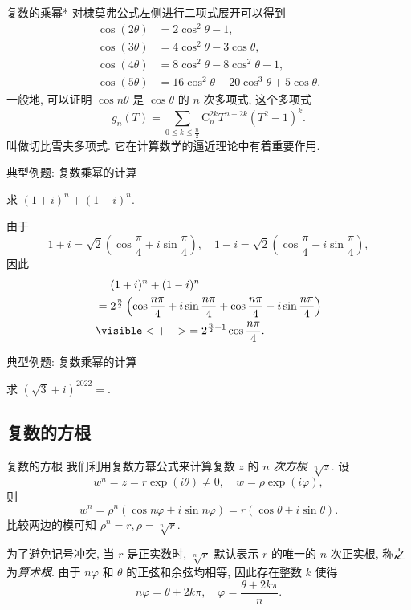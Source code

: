 \begin{frame}{复数的乘幂*}
\onslide<+->
对棣莫弗公式左侧进行二项式展开可以得到
\onslide<+->
\begin{align*}
	\cos(2\theta)&=2\cos^2\theta-1,\\
	\cos(3\theta)&=4\cos^2\theta-3\cos\theta,\\
	\cos(4\theta)&=8\cos^2\theta-8\cos^2\theta+1,\\
	\cos(5\theta)&=16\cos^2\theta-20\cos^3\theta+5\cos\theta.
\end{align*}
\onslide<+->
一般地, 可以证明 $\cos{n\theta}$ 是 $\cos\theta$ 的 $n$ 次多项式,
\onslide<+->
这个多项式
\[g_n(T)=\sum_{0\le k\le\frac n2}\mathrm{C}_n^{2k} T^{n-2k} (T^2-1)^k.\]
叫做切比雪夫多项式.
\onslide<+->
它在计算数学的逼近理论中有着重要作用.
\end{frame}


\begin{frame}{典型例题: 复数乘幂的计算}
\onslide<+->
\begin{example}
求 $(1+i)^n+(1-i)^n$.
\end{example}
\onslide<+->
\begin{solution}
由于
\[1+i=\sqrt2\left(\cos\frac\pi4+i\sin\frac\pi4\right),\quad
1-i=\sqrt2\left(\cos\frac\pi4-i\sin\frac\pi4\right),\]
\onslide<+->
因此
\vspace{-\baselineskip}
\begin{align*}
&\peq(1+i)^n+(1-i)^n\\
&=2^{\frac n2}\left(\cos\frac{n\pi}4+i\sin\frac{n\pi}4+\cos\frac{n\pi}4-i\sin\frac{n\pi}4\right)\\
&\visible<+->{=2^{\frac n2+1}\cos\frac{n\pi}4.}
\end{align*}
\vspace{-\baselineskip}
\end{solution}
\end{frame}


\begin{frame}{典型例题: 复数乘幂的计算}
\onslide<+->
\begin{exercise}
求 $(\sqrt3+i)^{2022}=$.
\end{exercise}
\end{frame}


\subsection{复数的方根}
\begin{frame}{复数的方根}
\onslide<+->
我们利用复数方幂公式来计算复数 $z$ 的 \emph{$n$ 次方根 $\sqrt[n]z$}.
\onslide<+->
设
\[w^n=z=r\exp(i\theta)\neq0,\quad w=\rho\exp(i\varphi),\]
\onslide<+->
则
\[w^n=\rho^n(\cos{n\varphi}+i\sin{n\varphi})=r(\cos\theta+i\sin\theta).\]
\onslide<+->
比较两边的模可知 $\rho^n=r,\rho=\sqrt[n]r$.

\onslide<+->
为了避免记号冲突, 当 $r$ 是正实数时, $\sqrt[n]r$ 默认表示 $r$ 的唯一的 $n$ 次正实根, 称之为\emph{算术根}.
\onslide<+->
由于 $n\varphi$ 和 $\theta$ 的正弦和余弦均相等, 因此存在整数 $k$ 使得
\[n\varphi=\theta+2k\pi,\quad \varphi=\frac{\theta+2k\pi}n.\]
\end{frame}



